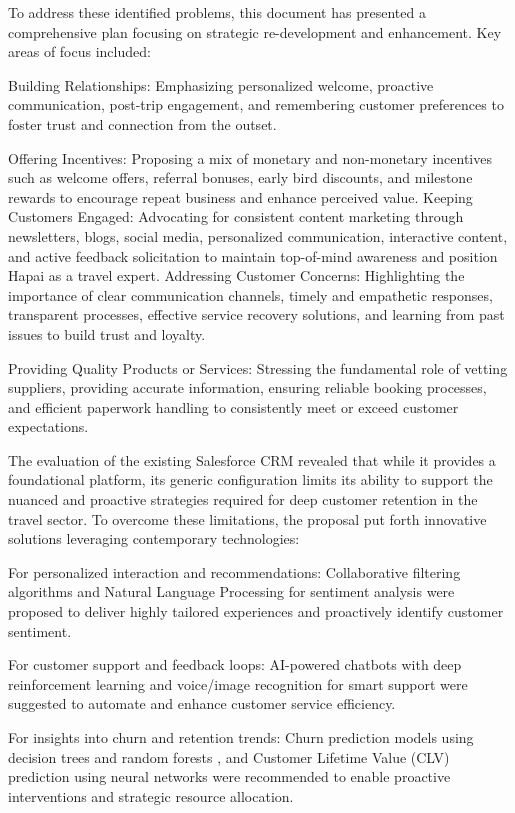 \documentclass{article}
\begin{document}
To address these identified problems, this document has presented a comprehensive plan focusing on strategic re-development and enhancement. Key areas of focus included:

Building Relationships: Emphasizing personalized welcome, proactive communication, post-trip engagement, and remembering customer preferences to foster trust and connection from the outset.


Offering Incentives: Proposing a mix of monetary and non-monetary incentives such as welcome offers, referral bonuses, early bird discounts, and milestone rewards to encourage repeat business and enhance perceived value.
Keeping Customers Engaged: Advocating for consistent content marketing through newsletters, blogs, social media, personalized communication, interactive content, and active feedback solicitation to maintain top-of-mind awareness and position Hapai as a travel expert.
Addressing Customer Concerns: Highlighting the importance of clear communication channels, timely and empathetic responses, transparent processes, effective service recovery solutions, and learning from past issues to build trust and loyalty.


Providing Quality Products or Services: Stressing the fundamental role of vetting suppliers, providing accurate information, ensuring reliable booking processes, and efficient paperwork handling to consistently meet or exceed customer expectations.

The evaluation of the existing Salesforce CRM revealed that while it provides a foundational platform, its generic configuration limits its ability to support the nuanced and proactive strategies required for deep customer retention in the travel sector. To overcome these limitations, the proposal put forth innovative solutions leveraging contemporary technologies:

For personalized interaction and recommendations: Collaborative filtering algorithms  and Natural Language Processing for sentiment analysis  were proposed to deliver highly tailored experiences and proactively identify customer sentiment.

For customer support and feedback loops: AI-powered chatbots with deep reinforcement learning  and voice/image recognition for smart support  were suggested to automate and enhance customer service efficiency.

For insights into churn and retention trends: Churn prediction models using decision trees and random forests , and Customer Lifetime Value (CLV) prediction using neural networks  were recommended to enable proactive interventions and strategic resource allocation.
\end{document}
